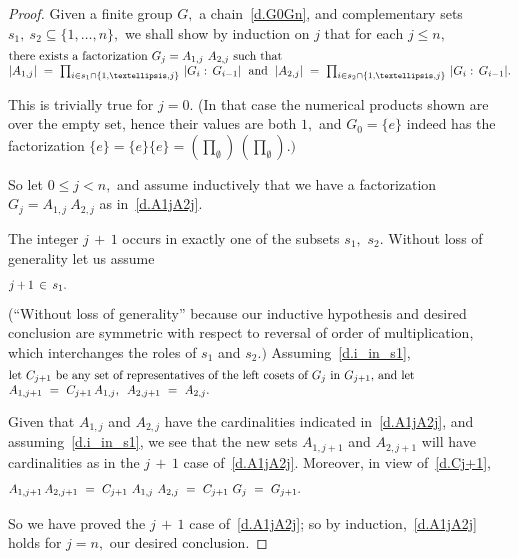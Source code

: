 \documentclass[10pt,a4paper]{amsart}
\begin{document}
\begin{proof}
Given a finite group $G,$ a chain~\eqref{d.G0Gn}, and
complementary sets $s_1,\ s_2\subseteq\{1,\dots,n\},$
we shall show by induction on $j$ that for each $j\leq n,$
%
\begin{equation}\begin{minipage}[c]{35pc}\label{d.A1jA2j}
there exists a factorization $G_j=A_{1,j}\ A_{2,j}$ such that \\
$|A_{1,j}|\ =\ \prod_{i\in s_1\cap\{1,\dots,j\}}\,|G_i:\,G_{i-1}|$ \ and
\ $|A_{2,j}|\ =\ \prod_{i\in s_2\cap\{1,\dots,j\}}\,|G_i:\,G_{i-1}|.$
\end{minipage}\end{equation}

This is trivially true for $j=0.$
(In that case the numerical products shown are over the empty set,
hence their values are both $1,$ and
$G_0=\{e\}$ indeed has the factorization $\{e\}=\{e\}\{e\}=
(\prod_\emptyset)\,(\prod_\emptyset).)$

So let $0\leq j<n,$ and assume inductively that
we have a factorization $G_j=A_{1,j}\ A_{2,j}$ as in~\eqref{d.A1jA2j}.

The integer $j\,{+}\,1$ occurs in exactly
one of the subsets $s_1,$ $s_2.$
Without loss of generality let us assume
%
\begin{equation}\begin{minipage}[c]{35pc}\label{d.i_in_s1}
$j\,{+}\,1\,\in\,s_1.$
\end{minipage}\end{equation}
%
(``Without loss of generality'' because our inductive
hypothesis and desired conclusion are symmetric
with respect to reversal of order of multiplication, which
interchanges the roles of $s_1$ and $s_2.)$
Assuming~\eqref{d.i_in_s1},
%
\begin{equation}\begin{minipage}[c]{35pc}\label{d.Cj+1}
let $C_{j+1}$ be any set of representatives
of the left cosets of $G_j$ in $G_{j+1},$ and let \\
$A_{1,j+1}\ =\ C_{j+1}\,A_{1,j},$ \ $A_{2,j+1}\ =\ A_{2,j}.$
\end{minipage}\end{equation}

Given that $A_{1,j}$ and $A_{2,j}$
have the cardinalities indicated in~\eqref{d.A1jA2j},
and assuming~\eqref{d.i_in_s1}, we see that
the new sets $A_{1,j+1}$ and $A_{2,j+1}$ will
have cardinalities as in the $j\,{+}\,1$ case of~\eqref{d.A1jA2j}.
Moreover, in view of~\eqref{d.Cj+1},
%
\begin{equation}\begin{minipage}[c]{35pc}\label{d.CiA1}
$A_{1,j+1}\,A_{2,j+1}\ =\ C_{j+1}\ A_{1,j}\ A_{2,j}\ =\ C_{j+1}\ G_j\
=\ G_{j+1}.$
\end{minipage}\end{equation}

So we have proved the $j\,{+}\,1$ case of~\eqref{d.A1jA2j}; so by
induction,~\eqref{d.A1jA2j} holds for $j=n,$ our desired conclusion.
\end{proof}
\end{document}
